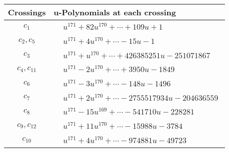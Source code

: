 \documentclass[1p]{elsarticle_modified}
\theoremstyle{definition}
\begin{document}
\begin{tabular}{m{50pt}|m{274pt}}
Crossings & \hspace{64pt}u-Polynomials at each crossing \\
\hline $$\begin{aligned}c_{1}\end{aligned}$$&$\begin{aligned}
&u^{171}+82 u^{170}+\cdots+109 u+1
\end{aligned}$\\
\hline $$\begin{aligned}c_{2},c_{5}\end{aligned}$$&$\begin{aligned}
&u^{171}+4 u^{170}+\cdots-15 u-1
\end{aligned}$\\
\hline $$\begin{aligned}c_{3}\end{aligned}$$&$\begin{aligned}
&u^{171}+u^{170}+\cdots+426385251 u-251071867
\end{aligned}$\\
\hline $$\begin{aligned}c_{4},c_{11}\end{aligned}$$&$\begin{aligned}
&u^{171}-2 u^{170}+\cdots+3950 u-1849
\end{aligned}$\\
\hline $$\begin{aligned}c_{6}\end{aligned}$$&$\begin{aligned}
&u^{171}-3 u^{170}+\cdots-148 u-1496
\end{aligned}$\\
\hline $$\begin{aligned}c_{7}\end{aligned}$$&$\begin{aligned}
&u^{171}+2 u^{170}+\cdots-2755517934 u-204636559
\end{aligned}$\\
\hline $$\begin{aligned}c_{8}\end{aligned}$$&$\begin{aligned}
&u^{171}-15 u^{169}+\cdots-541710 u-228281
\end{aligned}$\\
\hline $$\begin{aligned}c_{9},c_{12}\end{aligned}$$&$\begin{aligned}
&u^{171}+11 u^{170}+\cdots-15988 u-3784
\end{aligned}$\\
\hline $$\begin{aligned}c_{10}\end{aligned}$$&$\begin{aligned}
&u^{171}+4 u^{170}+\cdots-974881 u-49723
\end{aligned}$\\
\hline
\end{tabular}\\~\\
\end{document}
